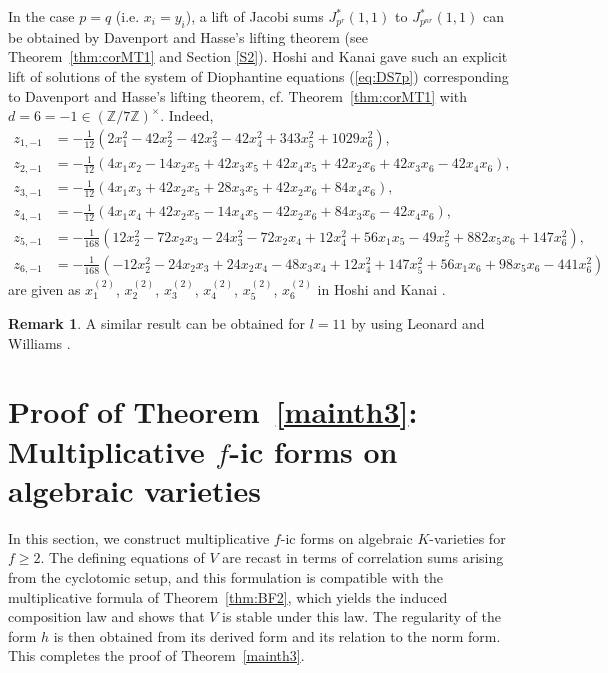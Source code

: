 \documentclass[a4paper, 11pt]{amsart}
\newcommand{\Z}{\mathbb Z}
\theoremstyle{plain}
\theoremstyle{definition}
\newtheorem{remark}[thm]{Remark}
\numberwithin{equation}{section}
\begin{document}
In the case
$p=q$ (i.e. $x_i=y_i$), 
a lift of Jacobi sums $J^\ast_{p^r}(1,1)$ to $J^\ast_{p^{nr}}(1,1)$ 
can be obtained by Davenport and Hasse's lifting theorem 
(see Theorem~\ref{thm:corMT1} and Section \ref{S2}). 
Hoshi and Kanai \cite[Section 7, (3) $e=7$]{HK22} 
gave such an explicit lift of solutions of the system of Diophantine equations (\ref{eq:DS7p}) corresponding to Davenport and Hasse's lifting theorem, cf. Theorem~\ref{thm:corMT1} with 
$d=6=-1 \in(\Z/7\Z)^{\times}$. 
Indeed,   
\begin{align*}
z_{1,-1} &= -\frac{1}{12}(2x_1^2 - 42x_2^2 - 42x_3^2 - 42x_4^2 + 343x_5^2 +1029x_6^2),\\
z_{2,-1} &= -\frac{1}{12}(4x_1x_2 - 14x_2x_5 + 42x_3x_5 + 42x_4x_5 + 42x_2x_6 + 42x_3x_6 - 42x_4x_6),\\
z_{3,-1} &= -\frac{1}{12}(4x_1x_3 + 42x_2x_5 + 28x_3x_5 + 42x_2x_6 + 84x_4x_6),\\
z_{4,-1} &= -\frac{1}{12}(4x_1x_4 + 42x_2x_5 - 14x_4x_5 - 42x_2x_6 + 84x_3x_6 - 42x_4x_6),\\
z_{5,-1} &= -\frac{1}{168}(12x_2^2 - 72x_2x_3 - 24x_3^2 - 72x_2x_4 + 12x_4^2 + 56x_1x_5 - 49x_5^2 + 882x_5x_6 + 147x_6^2),\\
z_{6,-1} &= -\frac{1}{168}(-12x_2^2 - 24x_2x_3 + 24x_2x_4 - 48x_3x_4 + 12x_4^2 + 147x_5^2 + 56x_1x_6 + 98x_5x_6 - 441x_6^2)
\end{align*}
are given as $x_1^{(2)}$, $x_2^{(2)}$, $x_3^{(2)}$, 
$x_4^{(2)}$, $x_5^{(2)}$, $x_6^{(2)}$ 
in Hoshi and Kanai \cite[page 24, lines 5--10]{HK22}. 

\begin{remark}
A similar result can be obtained for $l=11$ 
by using Leonard and Williams \cite{LW75b}.
\end{remark}

\section{Proof of Theorem~\ref{mainth3}: Multiplicative $f$-ic forms on algebraic varieties}\label{S5}

In this section, we construct multiplicative $f$-ic forms on algebraic $K$-varieties for $f \ge 2$. 
The defining equations of $V$ are recast in terms of correlation sums arising from the cyclotomic setup, and this formulation is compatible with the multiplicative formula of Theorem~\ref{thm:BF2}, which yields the induced composition law and shows that $V$ is stable under this law. 
The regularity of the form $h$ is then obtained from its derived form and its relation to the norm form. 
This completes the proof of Theorem~\ref{mainth3}.
\end{document}
